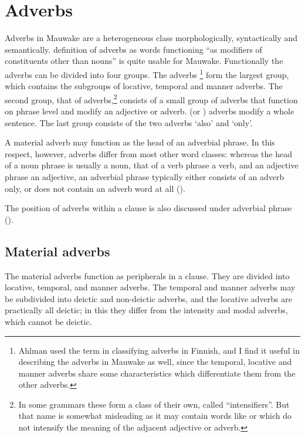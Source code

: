 \section{Adverbs}\label{sec:3:9}
{}
Adverbs in Mauwake are a heterogeneous class morphologically, syntactically and semantically.  definition of adverbs as words functioning ``{as modifiers of constituents other than nouns}'' is quite usable for Mauwake. Functionally the adverbs can be divided into four groups. The  adverbs \citep{Ahlman1933}\footnote{Ahlman used the term in classifying adverbs in Finnish, and I find it useful in describing the adverbs in Mauwake as well, since the temporal, locative and manner adverbs share some characteristics which differentiate them from the other adverbs.} form the largest group, which contains the subgroups of locative, temporal and manner adverbs. The second group, that of  adverbs,\footnote{In some grammars these form a class of their own, called ``intensifiers''. But that name is somewhat misleading as it may contain words like  or  which do not intensify the meaning of the adjacent adjective or adverb.} consists of a small group of adverbs that function on phrase level and modify an adjective or adverb.  (or ) adverbs modify a whole sentence. The last group consists of the two  adverbs  `also' and  `only'.

A material adverb may function as the head of an adverbial phrase. In this respect, however, adverbs differ from most other word classes: whereas the head of a noun phrase is usually a noun, that of a verb phrase a verb, and an adjective phrase an adjective, an adverbial phrase typically either consists of an adverb only, or does not contain an adverb word at all (). 

The position of adverbs within a clause is also discussed under adverbial phrase ().

\subsection{Material adverbs}\label{sec:3.9.1}
{}
The material adverbs function as peripherals in a clause. They are divided into locative, temporal, and manner adverbs. The temporal and manner adverbs may be subdivided into deictic and non-deictic adverbs, and the locative adverbs are practically all deictic; in this they differ from the intensity and modal adverbs, which cannot be deictic.

